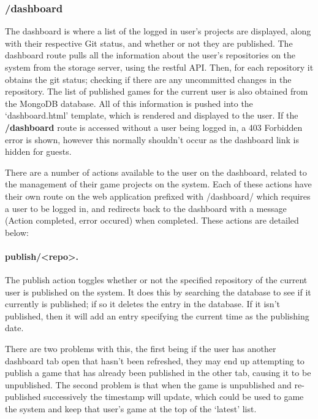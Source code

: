 	\subsubsection{/dashboard}
	The dashboard is where a list of the logged in user's projects are displayed, along with their respective Git status, and whether or not they are published. The dashboard route pulls all the information about the user's repositories on the system from the storage server, using the restful API. Then, for each repository it obtains the git status; checking if there are any uncommitted changes in the repository. The list of published games for the current user is also obtained from the MongoDB database. All of this information is pushed into the `dashboard.html' template, which is rendered and displayed to the user. If the \textbf{/dashboard} route is accessed without a user being logged in, a 403 Forbidden error is shown, however this normally shouldn't occur as the dashboard link is hidden for guests.

	There are a number of actions available to the user on the dashboard, related to the management of their game projects on the system. Each of these actions have their own route on the web application prefixed with /dashboard/ which requires a user to be logged in, and redirects back to the dashboard with a message (Action completed, error occured) when completed. These actions are detailed below:

	\paragraph{publish/<repo>.}
	The publish action toggles whether or not the specified repository of the current user is published on the system. It does this by searching the database to see if it currently is published; if so it deletes the entry in the database. If it isn't published, then it will add an entry specifying the current time as the publishing date.

	There are two problems with this, the first being if the user has another dashboard tab open that hasn't been refreshed, they may end up attempting to publish a game that has already been published in the other tab, causing it to be unpublished. The second problem is that when the game is unpublished and re-published successively the timestamp will update, which could be used to game the system and keep that user's game at the top of the `latest' list.

